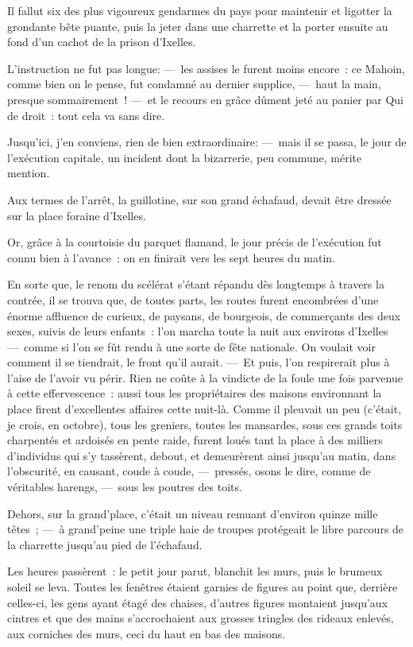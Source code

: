 \documentclass[french,twoside]{book} %
\begin{document}
Il fallut six des plus vigoureux gendarmes du pays pour maintenir et ligotter la grondante bête puante, puis la jeter dans une charrette et la porter ensuite au fond d’un cachot de la prison d’Ixelles.\par
L’instruction ne fut pas longue: — les assises le furent moins encore : ce Mahoin, comme bien on le pense, fut condamné au dernier supplice, — haut la main, presque sommairement ! — et le recours en grâce dûment jeté au panier par Qui de droit : tout cela va sans dire.\par
Jusqu’ici, j’en conviens, rien de bien extraordinaire: — mais il se passa, le jour de l’exécution capitale, un incident dont la bizarrerie, peu commune, mérite mention.\par
Aux termes de l’arrêt, la guillotine, sur son grand échafaud, devait être dressée sur la place foraine d’Ixelles.\par
Or, grâce à la courtoisie du parquet flamand, le jour précis de l’exécution fut connu bien à l’avance : on en finirait vers les sept heures du matin.\par
   En sorte que, le renom du scélérat s’étant répandu dès longtemps à travers la contrée, il se trouva que, de toutes parts, les routes furent encombrées d’une énorme affluence de curieux, de paysans, de bourgeois, de commerçants des deux sexes, suivis de leurs enfants : l’on marcha toute la nuit aux environs d’Ixelles— comme si l’on se fût rendu à une sorte de fête nationale. On voulait voir comment il se tiendrait, le front qu’il aurait. — Et puis, l’on respirerait plus à l’aise de l’avoir vu périr. Rien ne coûte à la vindicte de la foule une fois parvenue à cette effervescence : aussi tous les propriétaires des maisons environnant la place firent d’excellentes affaires cette nuit-là. Comme il pleuvait un peu (c’était, je crois, en octobre), tous les greniers, toutes les mansardes, sous ces grands toits charpentés et ardoisés en pente raide, furent loués tant la place à des milliers d’individus qui s’y tassèrent, debout, et demeurèrent ainsi jusqu’au matin, dans l’obscurité, en causant, coude à coude, — pressés, osons le dire, comme de véritables harengs, — sous les poutres des toits.\par
   Dehors, sur la grand’place, c’était un niveau remuant d’environ quinze mille têtes ; — à grand’peine une triple haie de troupes protégeait le libre parcours de la charrette jusqu’au pied de l’échafaud.\par
Les heures passèrent : le petit jour parut, blanchit les murs, puis le brumeux soleil se leva. Toutes les fenêtres étaient garnies de figures au point que, derrière celles-ci, les gens ayant étagé des chaises, d’autres figures montaient jusqu’aux cintres et que des mains s’accrochaient aux grosses tringles des rideaux enlevés, aux corniches des murs, ceci du haut en bas des maisons.\par
\end{document}
